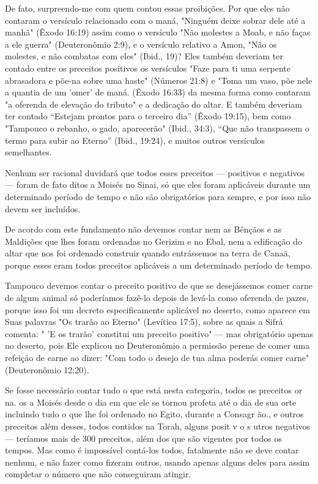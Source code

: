 De fato, surpreendo-me com quem contou essas proibições. Por que eles
não contaram o versículo relacionado com o maná, "Ninguém deixe so­brar
dele até a manhã" (Êxodo 16:19) assim como o versículo "Não molestes a
Moab, e não faças a ele guerra" (Deuteronômio 2:9), e o versículo
relativo a Amon, "Não os molestes, e não combatas com eles" (Ibid., 19)?
Eles também deveriam ter contado entre os preceitos positivos os
versículos "Faze para ti uma serpente abrasadora e põe-na sobre uma
haste" (Números 21:8) e "Toma um vaso, põe nele a quantia de um 'omer'
de maná. (Êxodo 16:33) da mesma forma como contaram "a
oferenda de elevação do tributo" e a dedicação do altar. E também
deveriam ter contado ``Estejam prontos para o terceiro dia'' (Êxodo
19:15), bem como "Tampouco o rebanho, o gado, aparecerão" (Ibid., 34:3),
``Que não transpassem o termo para subir ao Eterno'' (Ibid., 19:24), e
muitos outros versículos semelhantes.

Nenhum ser racional duvidará que todos esses preceitos --- positi­vos e
negativos --- foram de fato ditos a Moisés no Sinai, só que eles foram
apli­cáveis durante um determinado período de tempo e não são
obrigatórios para sempre, e por isso não devem ser incluídos.

De acordo com este fundamento não devemos contar nem as Bênçãos 
e as Maldições que lhes foram ordenadas no Gerizim e no Ebal, nem a
edi­ficação do altar que nos foi ordenado construir quando entrássemos
na terra de Canaã, porque esses eram todos preceitos aplicáveis a um
determinado pe­ríodo de tempo.

Tampouco devemos contar o preceito positivo de que se desejásse­mos
comer carne de algum animal só poderíamos fazê-lo depois de levá-la
co­mo oferenda de pazes, porque isso foi um decreto especificamente
aplicável no deserto, como aparece em Suas palavras "Os trarão ao
Eterno" (Levítico 17:5), sobre as quais a Sifrá comenta: " 'E os trarão'
constitui um preceito positivo" --- mas obrigatório apenas no deserto,
pois Ele explicou no Deuteronômio a permissão perene de comer uma
refeição de carne ao dizer: "Com todo o dese­jo de tua alma poderás
comer carne" (Deuteronômio 12:20).

Se fosse necessário contar tudo o que está nesta categoria, todos os
preceitos or na. os a Moisés desde o dia em que ele se tornou profeta
até o dia de sua orte incluindo tudo o que lhe foi ordenado no Egito,
durante a Consagr ão., e outros preceitos além desses,
todos contidos na Torah, al­guns posit v o s utros negativos ---
teríamos mais de 300 preceitos, além dos que são vigentes por todos os
tempos. Mas como é impossível contá-los todos, fatalmente não se deve
contar nenhum, e não fazer como fizeram outros, usan­do apenas alguns
deles para assim completar o número que não conseguiram atingir.

